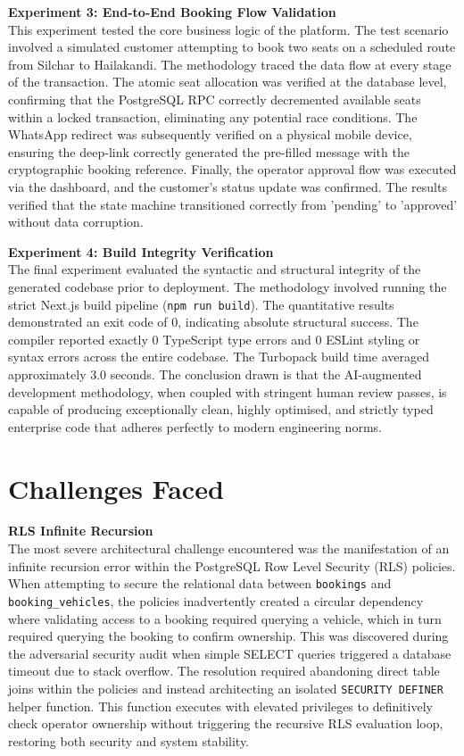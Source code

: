 \documentclass[12pt,a4paper]{report}
\begin{document}
\textbf{Experiment 3: End-to-End Booking Flow Validation}\\
This experiment tested the core business logic of the platform. The test scenario involved a simulated customer attempting to book two seats on a scheduled route from Silchar to Hailakandi. The methodology traced the data flow at every stage of the transaction. The atomic seat allocation was verified at the database level, confirming that the PostgreSQL RPC correctly decremented available seats within a locked transaction, eliminating any potential race conditions. The WhatsApp redirect was subsequently verified on a physical mobile device, ensuring the deep-link correctly generated the pre-filled message with the cryptographic booking reference. Finally, the operator approval flow was executed via the dashboard, and the customer's status update was confirmed. The results verified that the state machine transitioned correctly from 'pending' to 'approved' without data corruption.

\textbf{Experiment 4: Build Integrity Verification}\\
The final experiment evaluated the syntactic and structural integrity of the generated codebase prior to deployment. The methodology involved running the strict Next.js build pipeline (\texttt{npm run build}). The quantitative results demonstrated an exit code of 0, indicating absolute structural success. The compiler reported exactly 0 TypeScript type errors and 0 ESLint styling or syntax errors across the entire codebase. The Turbopack build time averaged approximately 3.0 seconds. The conclusion drawn is that the AI-augmented development methodology, when coupled with stringent human review passes, is capable of producing exceptionally clean, highly optimised, and strictly typed enterprise code that adheres perfectly to modern engineering norms.

\chapter{Challenges Faced}

\textbf{RLS Infinite Recursion}\\
The most severe architectural challenge encountered was the manifestation of an infinite recursion error within the PostgreSQL Row Level Security (RLS) policies. When attempting to secure the relational data between \texttt{bookings} and \texttt{booking\_vehicles}, the policies inadvertently created a circular dependency where validating access to a booking required querying a vehicle, which in turn required querying the booking to confirm ownership. This was discovered during the adversarial security audit when simple SELECT queries triggered a database timeout due to stack overflow. The resolution required abandoning direct table joins within the policies and instead architecting an isolated \texttt{SECURITY DEFINER} helper function. This function executes with elevated privileges to definitively check operator ownership without triggering the recursive RLS evaluation loop, restoring both security and system stability.
\end{document}
